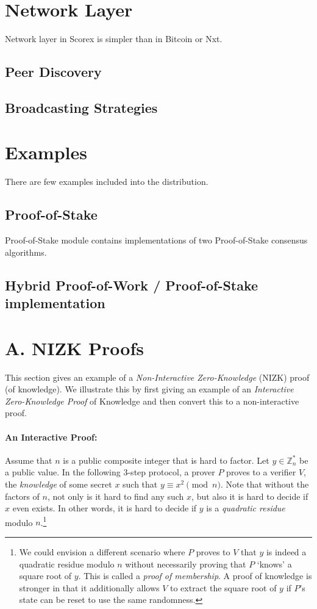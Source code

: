 \documentclass[]{report}   %
\begin{document}
\section{Network Layer}

Network layer in Scorex is simpler than in Bitcoin or Nxt. 

\subsection{Peer Discovery}

\subsection{Broadcasting Strategies}

\section{Examples}
There are few examples included into the distribution.

\subsection{Proof-of-Stake}
Proof-of-Stake module contains implementations of two Proof-of-Stake consensus algorithms. 

\subsection{Hybrid Proof-of-Work / Proof-of-Stake implementation}




\appendix
\section*{A. NIZK Proofs}

This section gives an example of a {\em Non-Interactive Zero-Knowledge} (NIZK) proof (of knowledge). We illustrate this by first giving an example of an {\em Interactive Zero-Knowledge Proof} of Knowledge and then convert this to a non-interactive proof. 

\paragraph{An Interactive Proof:} Assume that $n$ is a public composite integer that is hard to factor.
Let $y\in \mathbb{Z}^*_n$ be a public value. In the following 3-step protocol, a prover $P$ proves to a verifier $V$, the {\em knowledge} of some secret $x$ such that $y\equiv x^2 \pmod{n}$.
Note that without the factors of $n$, not only is it hard to find any such $x$, but also it is hard to decide if $x$ even exists. In other words, it is hard to decide if $y$ is a {\em  quadratic residue} modulo $n$.\footnote{We could envision a different scenario where $P$ proves to $V$ that $y$ is indeed a quadratic residue modulo $n$ without necessarily proving that $P$ `knows' a square root of $y$. This is called a {\em proof of membership}. A proof of knowledge is stronger in that it additionally allows $V$ to extract the square root of $y$ if $P$'s state can be reset to use the same randomness.}
\end{document}
